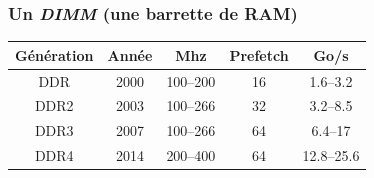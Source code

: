 \documentclass[xcolor={x11names,svgnames}]{beamer}
\begin{document}

\begin{frame}
  \frametitle{Un \emph{DIMM} (une \og barrette de RAM\fg{})}


  \vfill
  
  \centering\small
  \begin{tabular}{|c|c|c|c|c|}
  \hline
  Génération     & Année & Mhz       & Prefetch  & Go/s \\
  \hline\hline                                                    
  DDR\phantom{1} & 2000  & 100--200  & 16        &  1.6--3.2 \\
  \hline                                                          
  DDR2           & 2003  & 100--266  & 32        &  3.2--8.5 \\
  \hline                                                          
  DDR3           & 2007  & 100--266  & 64        &  6.4--17 \\
  \hline                                                          
  DDR4           & 2014  & 200--400  & 64        &  12.8--25.6 \\
    \hline
\end{tabular}
\vfill
\end{frame}

\end{document}
